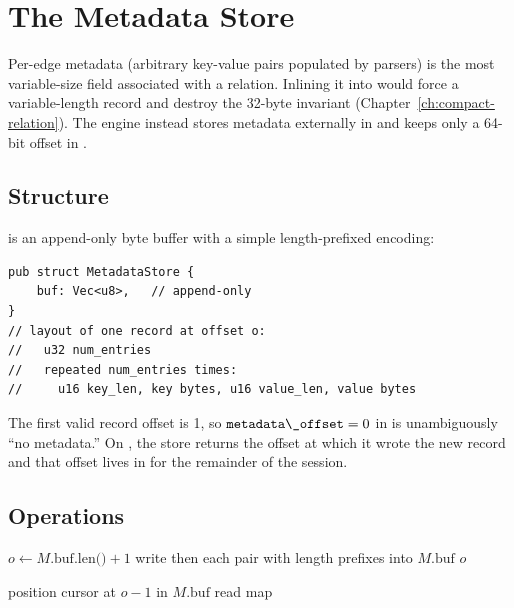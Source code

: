 \chapter{The Metadata Store}
\label{ch:metadata}

Per-edge metadata (arbitrary 
key-value pairs populated by parsers) is the most variable-size
field associated with a relation. Inlining it into \Compact{}
would force a variable-length record and destroy the 32-byte
invariant (Chapter~\ref{ch:compact-relation}). The engine instead
stores metadata externally in  and keeps only
a 64-bit offset in \Compact{}.

\section{Structure}

 is an append-only byte buffer with a simple
length-prefixed encoding:

\begin{lstlisting}[style=rust]
pub struct MetadataStore {
    buf: Vec<u8>,   // append-only
}
// layout of one record at offset o:
//   u32 num_entries
//   repeated num_entries times:
//     u16 key_len, key bytes, u16 value_len, value bytes
\end{lstlisting}

The first valid record offset is 1, so $\code{metadata\_offset} = 0$
in \Compact{} is unambiguously ``no metadata.'' On ,
the store returns the offset at which it wrote the new record and
that offset lives in \Compact{} for the remainder of the session.

\section{Operations}

\begin{algorithm}
\caption{\textsc{Metadata-Append}}\label{alg:meta-append}
$o \gets M.\text{buf.len()} + 1$\;
write  then each  pair with
 length prefixes into $M.\text{buf}$\;
\Return $o$\;
\end{algorithm}

\begin{algorithm}
\caption{\textsc{Metadata-Read}}\label{alg:meta-read}
position cursor at $o - 1$ in $M.\text{buf}$\;
read \;
\Return map\;
\end{algorithm}

